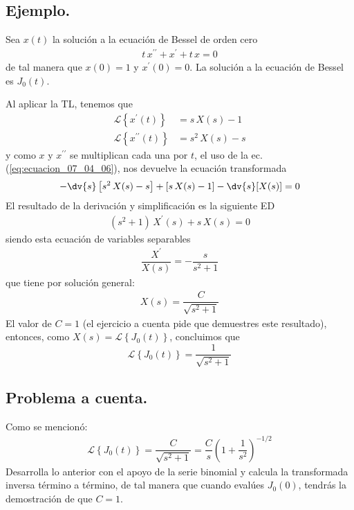 \subsection*{Ejemplo.}
Sea $x(t)$ la solución a la ecuación de Bessel de orden cero
\begin{align*}
t \, x^{\prime \prime} + x^{\prime} + t \, x = 0
\end{align*}
de tal manera que $x(0) = 1$ y $x^{\prime}(0) = 0$. La solución a la ecuación de Bessel es $J_{0}(t)$.
\par
Al aplicar la TL, tenemos que
\begin{align*}
\mathscr{L} \left\{ x^{\prime} (t) \right\} &= s \, X(s) - 1 \\
\mathscr{L} \left\{ x^{\prime \prime} (t) \right\} &= s^{2} \, X(s) - s
\end{align*}
y como $x$ y $x^{\prime \prime}$ se multiplican cada una por $t$, el uso de la ec. (\ref{eq:ecuacion_07_04_06}), nos devuelve la ecuación transformada
\begin{align*}
- \dv{s} \left[ s^{2} \, X(s) - s \right] + \left[s \, X(s) - 1 \right] - \dv{s} [X(s)] = 0
\end{align*}
El resultado de la derivación y simplificación es la siguiente ED
\begin{align*}
(s^{2} + 1) \, X^{\prime} (s) + s \, X(s) = 0
\end{align*}
siendo esta ecuación de variables separables
\begin{align*}
\dfrac{X^{\prime}}{X(s)} = - \dfrac{s}{s^{2} + 1}
\end{align*}
que tiene por solución general:
\begin{align*}
X(s) = \dfrac{C}{\sqrt{s^{2}+ 1}}
\end{align*}
El valor de $C = 1$ (el ejercicio a cuenta pide que demuestres este resultado), entonces, como $X(s) = \mathscr{L} \left\{ J_{0}(t) \right\}$, concluimos que
\begin{equation}
\mathscr{L} \left\{ J_{0}(t) \right\} = \dfrac{1}{\sqrt{s^{2}+ 1}}
\label{ec:ecuacion_07_04_10}
\end{equation}
\subsection*{Problema a cuenta.}
Como se mencionó:
\begin{align*}
\mathscr{L} \left\{ J_{0}(t) \right\} = \dfrac{C}{\sqrt{s^{2}+ 1}} =  \dfrac{C}{s} \left( 1 + \dfrac{1}{s^{2}} \right)^{-1/2}
\end{align*}
Desarrolla lo anterior con el apoyo de la serie binomial y calcula la transformada inversa término a término, de tal manera que cuando evalúes $J_{0}(0)$, tendrás la demostración de que $C = 1$.
